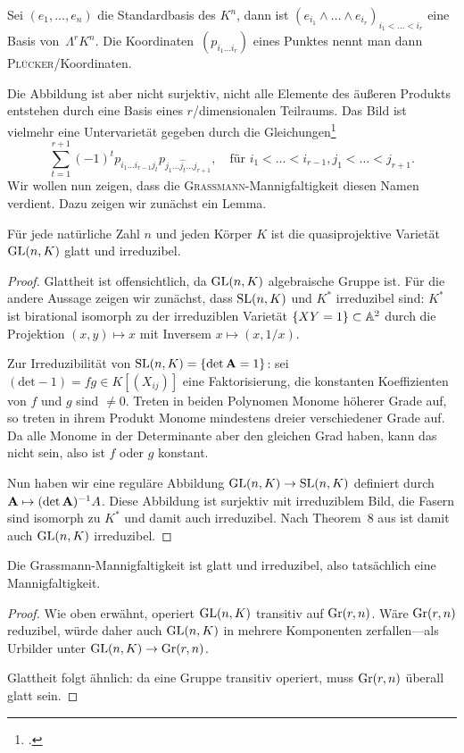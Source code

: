 Sei $(e_1, \dots, e_n)$ die Standardbasis des $K^n$, dann ist $(e_{i_1} \wedge \dots \wedge e_{i_r})_{i_1 < \dots < i_r}$ eine Basis von~$\Lambda^r K^n$. Die Koordinaten~$(p_{i_1 \dots i_r})$ eines Punktes nennt man dann \textsc{Plücker}\-/Koordinaten.

Die Abbildung ist aber nicht surjektiv, nicht alle Elemente des äußeren Produkts entstehen durch eine Basis eines $r$\-/dimensionalen Teilraums. Das Bild ist vielmehr eine Untervarietät gegeben durch die Gleichungen\footcite[siehe][S.~42]{Shafarevich}
\begin{equation} \label{eq:grcond}
\sum_{t=1}^{r+1} (-1)^t p_{i_1 \dots i_{r-1} j_t} p_{j_1 \dots \hat{j_t} \dots j_{r+1}}, \quad\text{für } i_1 < \dots < i_{r-1}, j_1 < \dots < j_{r+1}.
\end{equation}
Wir wollen nun zeigen, dass die \textsc{Grassmann}-Mannigfaltigkeit diesen Namen verdient. Dazu zeigen wir zunächst ein Lemma.

\begin{lemma}
Für jede natürliche Zahl $n$ und jeden Körper $K$ ist die quasiprojektive Varietät~$\mathrm{GL}(n,K)$ glatt und irreduzibel.
\end{lemma}
\begin{proof}
Glattheit ist offensichtlich, da $\mathrm{GL}(n,K)$ algebraische Gruppe ist. Für die andere Aussage zeigen wir zunächst, dass $\mathrm{SL}(n,K)$ und $K^*$ irreduzibel sind: $K^*$ ist birational isomorph zu der irreduziblen Varietät $\{ XY = 1 \} \subset \mathbb A^{2}$ durch die Projektion $(x,y) \mapsto x$ mit Inversem $x \mapsto (x,1/x)$.

Zur Irreduzibilität von $\mathrm{SL}(n,K) = \{\det \mathbf{A} = 1\}$: sei $(\mathrm{det}-1)=fg \in K[(X_{ij})]$ eine Faktorisierung, die konstanten Koeffizienten von $f$ und $g$ sind $\neq 0$. Treten in beiden Polynomen Monome höherer Grade auf, so treten in ihrem Produkt Monome mindestens dreier verschiedener Grade auf. Da alle Monome in der Determinante aber den gleichen Grad haben, kann das nicht sein, also ist $f$ oder $g$ konstant.

Nun haben wir eine reguläre Abbildung $\mathrm{GL}(n,K) \rightarrow \mathrm{SL}(n,K)$ definiert durch $\mathbf{A} \mapsto \mathbf{(}\!\det \mathbf{A})^{-1} A$. Diese Abbildung ist surjektiv mit irreduziblem Bild, die Fasern sind isomorph zu $K^*$ und damit auch irreduzibel. Nach Theorem~8 aus \cite[S.~77]{Shafarevich} ist damit auch $\mathrm{GL}(n,K)$ irreduzibel.
\end{proof}

\begin{fact}
Die Grassmann-Mannigfaltigkeit ist glatt und irreduzibel, also tatsächlich eine Mannigfaltigkeit.
\end{fact}
\begin{proof}
Wie oben erwähnt, operiert $\mathrm{GL}(n,K)$ transitiv auf $\grass r/n$. Wäre $\grass r/n$ reduzibel, würde daher auch $\mathrm{GL}(n,K)$ in mehrere Komponenten zerfallen---als Urbilder unter $\GL nK \to \grass r/n$.

Glattheit folgt ähnlich: da eine Gruppe transitiv operiert, muss $\grass r/n$ überall glatt sein.
\end{proof}

